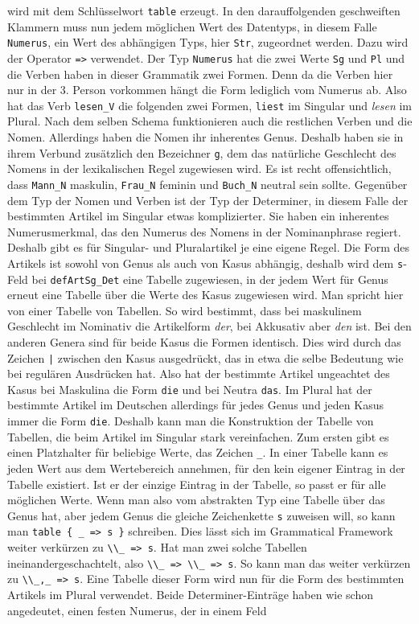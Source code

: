 \documentclass[12pt,abstract=on,titlepage,bibliography=totoc,ngerman,listof=totoc]{scrreprt}
\begin{document}
wird mit dem Schlüsselwort \texttt{table} erzeugt. In den darauffolgenden geschweiften Klammern muss nun jedem möglichen Wert des Datentyps, in diesem Falle \texttt{Numerus}, ein Wert des abhängigen Typs, hier \texttt{Str}, zugeordnet werden. Dazu wird der Operator \texttt{=>} verwendet. Der Typ \texttt{Numerus} hat die zwei Werte \texttt{Sg} und \texttt{Pl} und die Verben haben in dieser Grammatik zwei Formen. Denn da die Verben hier nur in der 3. Person vorkommen hängt die Form lediglich vom Numerus ab. Also hat das Verb \texttt{lesen\_V} die folgenden zwei Formen, \texttt{liest} im Singular und \textit{lesen} im Plural. Nach dem selben Schema funktionieren auch die restlichen Verben und die Nomen. Allerdings haben die Nomen ihr inherentes Genus. Deshalb haben sie in ihrem Verbund zusätzlich den Bezeichner \texttt{g}, dem das natürliche Geschlecht des Nomens in der lexikalischen Regel zugewiesen wird. Es ist recht offensichtlich, dass \texttt{Mann\_N} maskulin, \texttt{Frau\_N} feminin und \texttt{Buch\_N} neutral sein sollte. Gegenüber dem Typ der Nomen und Verben ist der Typ der Determiner, in diesem Falle der bestimmten Artikel im Singular etwas komplizierter. Sie haben ein inherentes Numerusmerkmal, das den Numerus des Nomens in der Nominanphrase regiert. Deshalb gibt es für Singular- und Pluralartikel je eine eigene Regel. Die Form des Artikels ist sowohl von Genus als auch von Kasus abhängig, deshalb wird dem  \texttt{s}-Feld bei \texttt{defArtSg\_Det} eine Tabelle zugewiesen, in der jedem Wert für Genus erneut eine Tabelle über die Werte des Kasus zugewiesen wird. Man spricht hier von einer Tabelle von Tabellen. So wird bestimmt, dass bei maskulinem Geschlecht im Nominativ die Artikelform \textit{der}, bei Akkusativ aber \textit{den} ist. Bei den anderen Genera sind für beide Kasus die Formen identisch. Dies wird durch das Zeichen \texttt{|} zwischen den Kasus ausgedrückt, das in etwa die selbe Bedeutung wie bei regulären Ausdrücken hat. Also hat der bestimmte Artikel ungeachtet des Kasus bei Maskulina die Form \texttt{die} und bei Neutra \texttt{das}. Im Plural hat der bestimmte Artikel im Deutschen allerdings für jedes Genus und jeden Kasus immer die Form \texttt{die}. Deshalb kann man die Konstruktion der Tabelle von Tabellen, die beim Artikel im Singular stark vereinfachen. Zum ersten gibt es einen Platzhalter für beliebige Werte, das Zeichen \texttt{\_}. In einer Tabelle kann es jeden Wert aus dem Wertebereich annehmen, für den kein eigener Eintrag in der Tabelle existiert. Ist er der einzige Eintrag in der Tabelle, so passt er für alle möglichen Werte. Wenn man also vom abstrakten Typ eine Tabelle über das Genus hat, aber jedem Genus die gleiche Zeichenkette \texttt{s} zuweisen will, so kann man \texttt{table \{ \_ => s \}} schreiben. Dies lässt sich im Grammatical Framework weiter verkürzen zu \texttt{\textbackslash{}\textbackslash{}\_ => s}. Hat man zwei solche Tabellen ineinandergeschachtelt, also \texttt{\textbackslash{}\textbackslash{}\_ => \textbackslash{}\textbackslash{}\_ => s}. So kann man das weiter verkürzen zu \texttt{\textbackslash{}\textbackslash{}\_,\_ => s}. Eine Tabelle dieser Form wird nun für die Form des bestimmten Artikels im Plural verwendet. Beide Determiner-Einträge haben wie schon angedeutet, einen festen Numerus, der in einem Feld 
\end{document}
